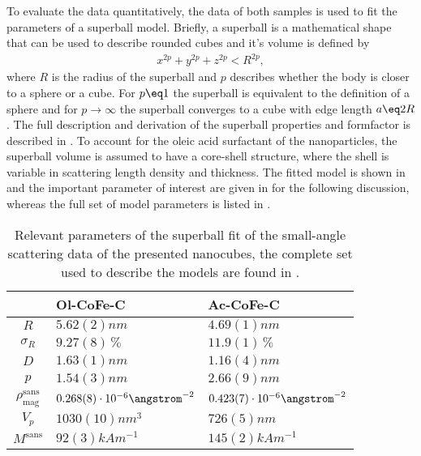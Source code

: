 \documentclass[\main/dresen_thesis.tex]{subfiles}
\begin{document}
    To evaluate the data quantitatively, the data of both samples is used to fit the parameters of a superball model.
    Briefly, a superball is a mathematical shape that can be used to describe rounded cubes and it's volume is defined by
    \begin{align}
      x^{2p} + y^{2p} + z^{2p} < R^{2p},
    \end{align}
    where $R$ is the radius of the superball and $p$ describes whether the body is closer to a sphere or a cube.
    For $p\eq 1$ the superball is equivalent to the definition of a sphere and for $p \rightarrow \infty$ the superball converges to a cube with edge length $a \eq 2R$.
    The full description and derivation of the superball properties and formfactor is described in .
    To account for the oleic acid surfactant of the nanoparticles, the superball volume is assumed to have a core-shell structure, where the shell is variable in scattering length density and thickness.
    The fitted model is shown in  and the important parameter of interest are given in  for the following discussion, whereas the full set of model parameters is listed in .
    \begin{table}[ht]
      \centering
      \caption{\label{tab:monolayers:nanoparticle:sas}Relevant parameters of the superball fit of the small-angle scattering data of the presented nanocubes, the complete set used to describe the models are found in .}
      \begin{tabular}{ c | l | l }
          & Ol-CoFe-C & Ac-CoFe-C \\
        \hline
        $R$
          & $5.62(2) \unit{nm}$
          & $4.69(1) \unit{nm}$\\
        $\sigma_R$
          & $9.27(8) \,\%$
          & $11.9(1) \,\%$\\
        $D$
          & $1.63(1) \unit{nm}$
          & $1.16(4) \unit{nm}$\\
        $p$
          & $1.54(3) \unit{nm}$
          & $2.66(9) \unit{nm}$\\
        $\rho_\mathrm{mag}^\mathrm{sans}$
          & $0.268(8) \cdot 10^{-6} \angstrom^{-2}$
          & $0.423(7) \cdot 10^{-6} \angstrom^{-2}$\\
        \hline
        $V_p$
          & $1030(10) \unit{nm^3}$
          & $726(5) \unit{nm}$\\
        $M^\mathrm{sans}$
          & $92(3) \unit{kAm^{-1}}$
          & $145(2) \unit{kAm^{-1}}$\\
        \hline
      \end{tabular}
    \end{table}
\end{document}
